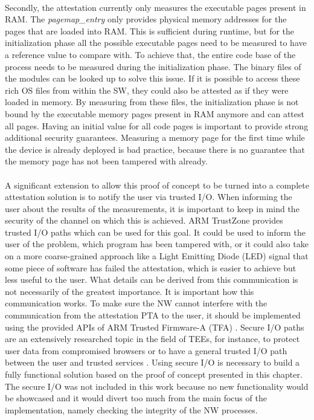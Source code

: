 \paragraph*{}
Secondly, the attestation currently only measures the executable pages present in RAM. The \textit{pagemap\_entry} only provides physical memory addresses for the pages that are loaded into RAM. This is sufficient during runtime, but for the initialization phase all the possible executable pages need to be measured to have a reference value to compare with. To achieve that, the entire code base of the process needs to be measured during the initialization phase. The binary files of the modules can be looked up to solve this issue. If it is possible to access these rich OS files from within the SW, they could also be attested as if they were loaded in memory. By measuring from these files, the initialization phase is not bound by the executable memory pages present in RAM anymore and can attest all pages. Having an initial value for all code pages is important to provide strong additional security guarantees. Measuring a memory page for the first time while the device is already deployed is bad practice, because there is no guarantee that the memory page has not been tampered with already. 

\paragraph*{}
A significant extension to allow this proof of concept to be turned into a complete attestation solution is to notify the user via trusted I/O. When informing the user about the results of the measurements, it is important to keep in mind the security of the channel on which this is achieved. ARM TrustZone provides trusted I/O paths which can be used for this goal. It could be used to inform the user of the problem, which program has been tampered with, or it could also take on a more coarse-grained approach like a Light Emitting Diode (LED) signal that some piece of software has failed the attestation, which is easier to achieve but less useful to the user. What details can be derived from this communication is not necessarily of the greatest importance. It is important how this communication works. To make sure the NW cannot interfere with the communication from the attestation PTA to the user, it should be implemented using the provided APIs of ARM Trusted Firmware-A (TFA) \cite{ARMfirmware}. Secure I/O paths are an extensively researched topic in the field of TEEs, for instance, to protect user data from compromised browsers \cite{EskandarianSaba2018FPUS} or to have a general trusted I/O path between the user and trusted services \cite{LiWenhao2014Btpo}. Using secure I/O is necessary to build a fully functional solution based on the proof of concept presented in this chapter. The secure I/O was not included in this work because no new functionality would be showcased and it would divert too much from the main focus of the implementation, namely checking the integrity of the NW processes.


